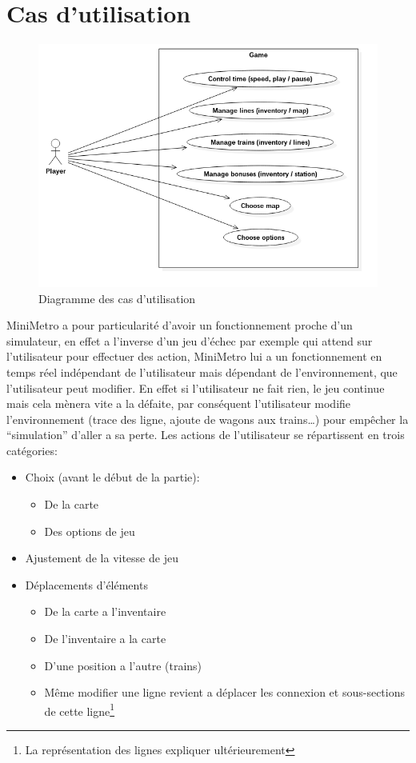 \documentclass[report, backcover, french, nodocumentinfo]{upmethodology-document}
\begin{document}
		\section{Cas d'utilisation}\label{useCases}
			\begin{figure}[h!]
				\centering
				\includegraphics[width=\textwidth]{figures/UseCaseDiagram}
				\caption{Diagramme des cas d'utilisation}
				\label{fig:UseCaseDiagram}
			\end{figure}
				MiniMetro a pour particularité d'avoir un fonctionnement proche d'un simulateur, en effet a l'inverse d'un jeu d'échec par exemple qui attend sur l'utilisateur pour effectuer des action, MiniMetro lui a un fonctionnement en temps réel indépendant de l'utilisateur mais dépendant de l’environnement, que l'utilisateur peut modifier. En effet si l'utilisateur ne fait rien, le jeu continue mais cela mènera vite a la défaite, par conséquent l'utilisateur modifie l’environnement (trace des ligne, ajoute de wagons aux trains\ldots) pour empêcher la ``simulation'' d'aller a sa perte.
				Les actions de l'utilisateur se répartissent en trois catégories:
				\begin{itemize}
					\item Choix (avant le début de la partie):
						\begin{itemize}
							\item De la carte
							\item Des options de jeu
						\end{itemize}
					\item Ajustement de la vitesse de jeu
					\item Déplacements d'éléments
						\begin{itemize}
							\item De la carte a l'inventaire
							\item De l'inventaire a la carte
							\item D'une position a l'autre (trains)
							\item Même modifier une ligne revient a déplacer les connexion et sous-sections de cette ligne\footnote{La représentation des lignes expliquer ultérieurement}
						\end{itemize}
				\end{itemize}
\end{document}
